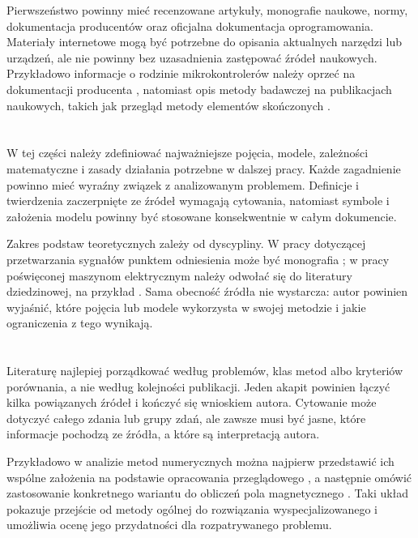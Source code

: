 Pierwszeństwo powinny mieć recenzowane artykuły, monografie naukowe, normy, dokumentacja producentów oraz oficjalna dokumentacja oprogramowania. Materiały internetowe mogą być potrzebne do opisania aktualnych narzędzi lub urządzeń, ale nie powinny bez uzasadnienia zastępować źródeł naukowych. Przykładowo informacje o rodzinie mikrokontrolerów należy oprzeć na dokumentacji producenta \cite{STM32Mic80:online}, natomiast opis metody badawczej na publikacjach naukowych, takich jak przegląd metody elementów skończonych \cite{jagota2013finite}.

\section{}

W tej części należy zdefiniować najważniejsze pojęcia, modele, zależności matematyczne i zasady działania potrzebne w dalszej pracy. Każde zagadnienie powinno mieć wyraźny związek z analizowanym problemem. Definicje i twierdzenia zaczerpnięte ze źródeł wymagają cytowania, natomiast symbole i założenia modelu powinny być stosowane konsekwentnie w całym dokumencie.

Zakres podstaw teoretycznych zależy od dyscypliny. W pracy dotyczącej przetwarzania sygnałów punktem odniesienia może być monografia \textcite{zielinski2007cyfrowe}; w pracy poświęconej maszynom elektrycznym należy odwołać się do literatury dziedzinowej, na przykład \cite{ronkowski2009maszyny}. Sama obecność źródła nie wystarcza: autor powinien wyjaśnić, które pojęcia lub modele wykorzysta w swojej metodzie i jakie ograniczenia z tego wynikają.

\section{}

Literaturę najlepiej porządkować według problemów, klas metod albo kryteriów porównania, a nie według kolejności publikacji. Jeden akapit powinien łączyć kilka powiązanych źródeł i kończyć się wnioskiem autora. Cytowanie może dotyczyć całego zdania lub grupy zdań, ale zawsze musi być jasne, które informacje pochodzą ze źródła, a które są interpretacją autora.

Przykładowo w analizie metod numerycznych można najpierw przedstawić ich wspólne założenia na podstawie opracowania przeglądowego \cite{jagota2013finite}, a następnie omówić zastosowanie konkretnego wariantu do obliczeń pola magnetycznego \cite{5424046}. Taki układ pokazuje przejście od metody ogólnej do rozwiązania wyspecjalizowanego i umożliwia ocenę jego przydatności dla rozpatrywanego problemu.

